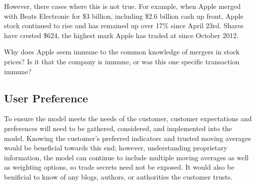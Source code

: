\documentclass[11pt]{article}
\begin{document}
However, there cases where this is not true. For example, when Apple merged with Beats Electronic for \$3 billion, including \$2.6 billion cash up front, Apple stock continued to rise and has remained up over 17\% since April 23rd. Shares have crested \$624, the highest mark Apple has traded at since October 2012.\textsuperscript{\cite{FORBES}}

Why does Apple seem immune to the common knowledge of mergers in stock prices? Is it that the company is immune, or was this one specific transaction immune?

\subsection*{User Preference}\label{UP}
To ensure the model meets the needs of the customer, customer expectations and preferences will need to be gathered, considered, and implemented into the model. Knowing the customer's preferred indicators and trusted moving averages would be beneficial towards this end; however, understanding proprietary information, the model can continue to include multiple moving averages as well as weighting options, so trade secrets need not be exposed. It would also be benificial to know of any blogs, authors, or authorities the customer trusts.





\end{document}
